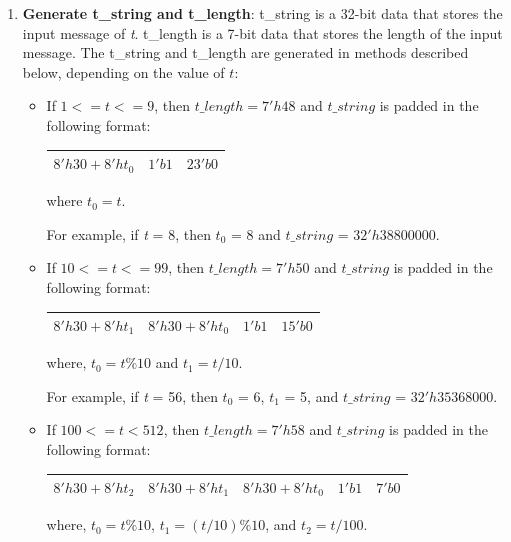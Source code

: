 \documentclass[main\_\_EN.tex]{subfiles}
\begin{document}
\begin{enumerate}\label{others:sha-512/t}
    \item \textbf{Generate t\_string and t\_length}: t\_string is a 32-bit data that stores the input message of {\it{t}}. t\_length is a 7-bit data that stores the length of the input message. The t\_string and t\_length are generated in methods described below, depending on the value of \begin{math}t\end{math}:

    \begin{itemize}
        \item If $1<=t<=9$, then $t\_length=7'h48$ and $t\_string$ is padded in the following format:\\
        \begin{longtable}[c]{|l|l|l|}
        \hline
        $8'h30+8'ht_0$ & $1'b1$ & $23'b0$\\
        \hline
        \end{longtable}
        where $t_0=t$.

        For example, if {\it{t}} = 8, then $t_0$ = 8 and $t\_string$ = $32'h38800000$.

        \item If $10<=t<=99$, then $t\_length=7'h50$ and $t\_string$ is padded in the following format:\\

        \begin{longtable}[c]{|l|l|l|l|}
        \hline
        $8'h30+8'ht_1$ & $8'h30+8'ht_0$ & $1'b1$ & $15'b0$\\
        \hline
        \end{longtable}
        where, $t_0=t\%10$ and $t_1=t/10$.

        For example, if {\it{t}} = 56, then $t_0$ = 6, $t_1$ = 5, and $t\_string$ = $32'h35368000$.

        \item If $100<=t<512$, then $t\_length=7'h58$ and $t\_string$ is padded in the following format:\\

        \begin{longtable}[c]{|l|l|l|l|l|}
        \hline
        $8'h30+8'ht_2$ & $8'h30+8'ht_1$ & $8'h30+8'ht_0$ & $1'b1$ & $7'b0$\\
        \hline
        \end{longtable}
        where, $t_0=t\%10$, $t_1=(t/10)\%10$, and $t_2=t/100$.


\end{itemize}
\end{enumerate}
\end{document}
